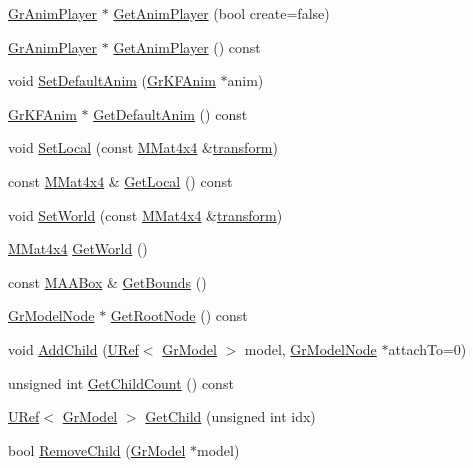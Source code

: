 \begin{CompactItemize}
\item 
\hyperlink{class_gr_anim_player}{GrAnimPlayer} $\ast$ \hyperlink{class_gr_model_1d20cf8034ee3a0bd2fe1506fe81f73d}{GetAnimPlayer} (bool create=false)
\item 
\hyperlink{class_gr_anim_player}{GrAnimPlayer} $\ast$ \hyperlink{class_gr_model_1759e9f0d11efd39892411dc80fd3312}{GetAnimPlayer} () const 
\item 
void \hyperlink{class_gr_model_8ae2497533c112953c1b4d4cc0e72cad}{SetDefaultAnim} (\hyperlink{class_gr_k_f_anim}{GrKFAnim} $\ast$anim)
\item 
\hyperlink{class_gr_k_f_anim}{GrKFAnim} $\ast$ \hyperlink{class_gr_model_a9b644ea4efa86b73299934940c8b155}{GetDefaultAnim} () const 
\item 
void \hyperlink{class_gr_model_e99405dcb83200626b7c715755f70836}{SetLocal} (const \hyperlink{class_m_mat4x4}{MMat4x4} \&\hyperlink{glext__bak_8h_07993c0d92c1aeeb357ba0495c8b5325}{transform})
\item 
const \hyperlink{class_m_mat4x4}{MMat4x4} \& \hyperlink{class_gr_model_539780a5145b366b29e97a480846f67d}{GetLocal} () const 
\item 
void \hyperlink{class_gr_model_a3f1827d34de5f0c67d20103cf0d97bc}{SetWorld} (const \hyperlink{class_m_mat4x4}{MMat4x4} \&\hyperlink{glext__bak_8h_07993c0d92c1aeeb357ba0495c8b5325}{transform})
\item 
\hyperlink{class_m_mat4x4}{MMat4x4} \hyperlink{class_gr_model_624ce6372c1bdd5a077e51c16adb9242}{GetWorld} ()
\item 
const \hyperlink{class_m_a_a_box}{MAABox} \& \hyperlink{class_gr_model_3667043cfbdca6e413d4de9d0449aa5f}{GetBounds} ()
\item 
\hyperlink{class_gr_model_node}{GrModelNode} $\ast$ \hyperlink{class_gr_model_c5dbd78174e81a8cd4c64782d9b21bc9}{GetRootNode} () const 
\item 
void \hyperlink{class_gr_model_c232d8ab1c8c5e6349acd53eebc9db61}{AddChild} (\hyperlink{class_u_ref}{URef}$<$ \hyperlink{class_gr_model}{GrModel} $>$ model, \hyperlink{class_gr_model_node}{GrModelNode} $\ast$attachTo=0)
\item 
unsigned int \hyperlink{class_gr_model_0d67f658382989a2dc3744dc88b28c22}{GetChildCount} () const 
\item 
\hyperlink{class_u_ref}{URef}$<$ \hyperlink{class_gr_model}{GrModel} $>$ \hyperlink{class_gr_model_462d3723b7fe4909bc9a92b3fcb0028c}{GetChild} (unsigned int idx)
\item 
bool \hyperlink{class_gr_model_9148b455251ccd009790f95c126ec936}{RemoveChild} (\hyperlink{class_gr_model}{GrModel} $\ast$model)

\end{CompactItemize}
